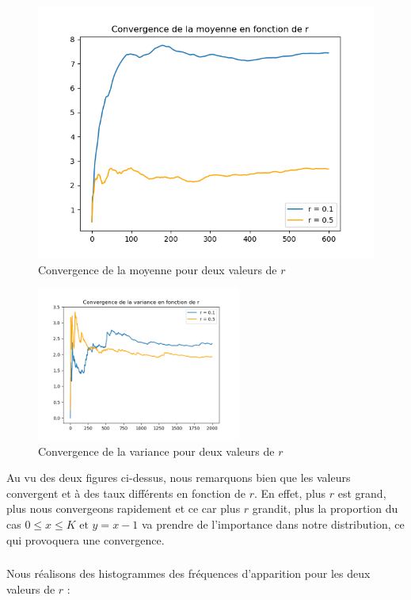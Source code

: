 \begin{figure}[H]
  \centering
  \includegraphics[width=.6\textwidth]{figs/convergence_mean.png}
  \caption{Convergence de la moyenne pour deux valeurs de $r$}
\end{figure}

\begin{figure}[H]
  \centering
  \includegraphics[width=0.6\textwidth]{figs/convergence_var.png}
  \caption{Convergence de la variance pour deux valeurs de $r$}
\end{figure}

Au vu des deux figures ci-dessus, nous remarquons bien que les valeurs convergent et à des taux différents en fonction de $r$. En effet, plus $r$ est grand, plus nous convergeons rapidement et ce car 
plus $r$ grandit, plus la proportion du cas $0 \leq x \leq K \text{ et } y = x-1$ va prendre de l'importance dans notre distribution, ce qui provoquera une convergence. 

\subsubsection{}
Nous réalisons des histogrammes des fréquences d'apparition pour les deux valeurs de $r$ :

